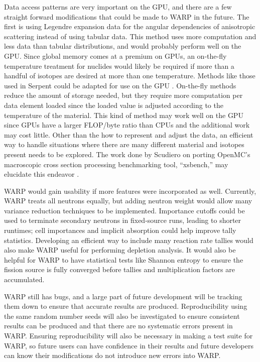 Data access patterns are very important on the GPU, and there are a few straight forward modifications that could be made to WARP in the future.  The first is using Legendre expansion data for the angular dependencies of anisotropic scattering instead of using tabular data.  This method uses more computation and less data than tabular distributions, and would probably perform well on the GPU.  Since global memory comes at a premium on GPUs, an on-the-fly temperature treatment for nuclides would likely be required if more than a handful of isotopes are desired at more than one temperature.  Methods like those used in Serpent could be adapted for use on the GPU \cite{serpent}.  On-the-fly methods reduce the amount of storage needed, but they require more computation per data element loaded since the loaded value is adjusted according to the temperature of the material.  This kind of method may work well on the GPU since GPUs have a larger FLOP/byte ratio than CPUs and the additional work may cost little.  Other than the how to represent and adjust the data, an efficient way to handle situations where there are many different material and isotopes present needs to be explored.  The work done by Scudiero on porting OpenMC's macroscopic cross section processing benchmarking tool, ``xsbench,'' may elucidate this endeavor \cite{openmc,scudiero}.

WARP would gain usability if more features were incorporated as well.  Currently, WARP treats all neutrons equally, but adding neutron weight would allow many variance reduction techniques to be implemented.  Importance cutoffs could be used to terminate secondary neutrons in fixed-source runs, leading to shorter runtimes; cell importances and implicit absorption could help improve tally statistics.  Developing an efficient way to include many reaction rate tallies would also make WARP useful for performing depletion analysis.  It would also be helpful for WARP to have statistical tests like Shannon entropy to ensure the fission source is fully converged before tallies and multiplication factors are accumulated.

WARP still has bugs, and a large part of future development will be tracking them down to ensure that accurate results are produced.  Reproducibility using the same random number seeds will also be investigated to ensure consistent results can be produced and that there are no systematic errors present in WARP.  Ensuring reproducibility will also be necessary in making a test suite for WARP, so future users can have confidence in their results and future developers can know their modifications do not introduce new errors into WARP.

